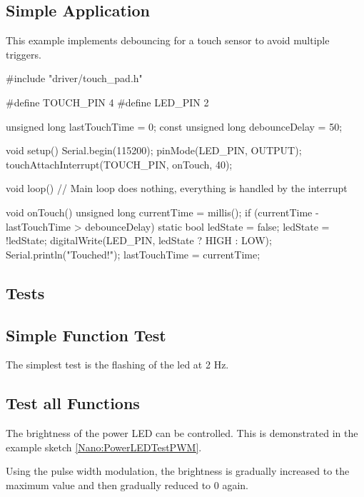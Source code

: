 \subsection{Simple Application}
This example implements debouncing for a touch sensor to avoid multiple triggers.

\begin{Arduino}
	#include "driver/touch_pad.h"
	
	#define TOUCH_PIN 4
	#define LED_PIN 2
	
	unsigned long lastTouchTime = 0;
	const unsigned long debounceDelay = 50;
	
	void setup() {
		Serial.begin(115200);
		pinMode(LED_PIN, OUTPUT);
		touchAttachInterrupt(TOUCH_PIN, onTouch, 40);
	}
	
	void loop() {
		// Main loop does nothing, everything is handled by the interrupt
	}
	
	void onTouch() {
		unsigned long currentTime = millis();
		if (currentTime - lastTouchTime > debounceDelay) {
			static bool ledState = false;
			ledState = !ledState;
			digitalWrite(LED_PIN, ledState ? HIGH : LOW);
			Serial.println("Touched!");
			lastTouchTime = currentTime;
		}
	}
	
	
	
\end{Arduino}




\subsection{Tests}

\subsection{Simple Function Test}

The simplest test is the flashing of the \ac{led} at 2 Hz.

{
	\label{Nano:PowerLEDTest}
}


\subsection{Test all Functions}

The brightness of the power LED can be controlled. This is demonstrated in the example sketch \ref{Nano:PowerLEDTestPWM}.

Using the pulse width modulation, the brightness is gradually increased to the maximum value and then gradually reduced to 0 again.




